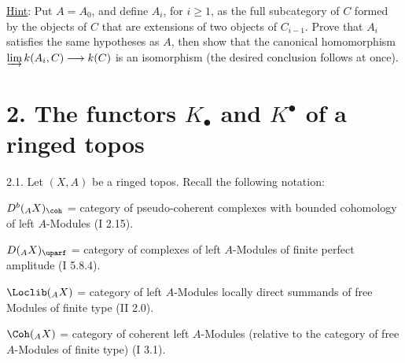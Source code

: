 \uline{Hint}: Put \(A=A_0\), and define \(A_i\), for \(i\geq1\), as the full subcategory of \(C\) formed by the objects of \(C\) that are extensions of two objects of \(C_{i-1}\). Prove that \(A_i\) satisfies the same hypotheses as \(A\), then show that the canonical homomorphism \(\varinjlim k(A_i,C)\longrightarrow k(C)\) is an isomorphism (the desired conclusion follows at once).

\section*{2. The functors \(K_{\bullet}\) and \(K^{\bullet}\) of a ringed topos}

2.1. Let \((X,A)\) be a ringed topos. Recall the following notation:

\(D^b({}_A X)_{\coh}\) = category of pseudo-coherent complexes with bounded cohomology of left \(A\)-Modules (I 2.15).

\(D({}_A X)_{\uparf}\) = category of complexes of left \(A\)-Modules of finite perfect amplitude (I 5.8.4).

\(\Loclib({}_A X)\) = category of left \(A\)-Modules locally direct summands of free Modules of finite type (II 2.0).

\(\Coh({}_A X)\) = category of coherent left \(A\)-Modules (relative to the category of free \(A\)-Modules of finite type) (I 3.1).

